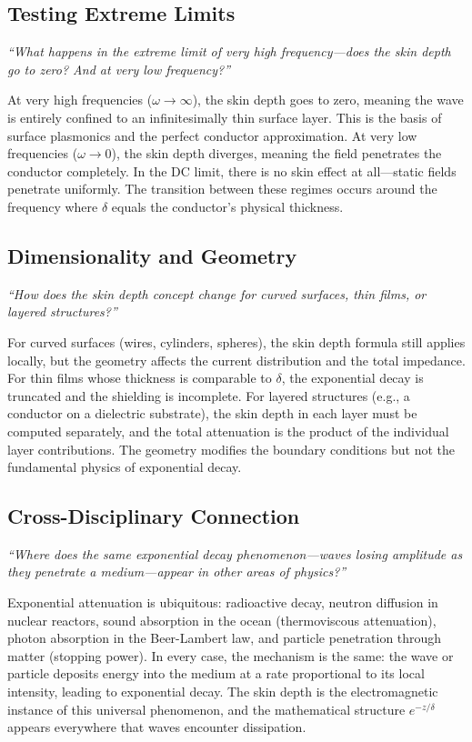 \subsection*{Testing Extreme Limits}
\textit{``What happens in the extreme limit of very high frequency---does the skin depth go to zero? And at very low frequency?''}

At very high frequencies ($\omega \to \infty$), the skin depth goes to zero, meaning the wave is entirely confined to an infinitesimally thin surface layer. This is the basis of surface plasmonics and the perfect conductor approximation. At very low frequencies ($\omega \to 0$), the skin depth diverges, meaning the field penetrates the conductor completely. In the DC limit, there is no skin effect at all---static fields penetrate uniformly. The transition between these regimes occurs around the frequency where $\delta$ equals the conductor's physical thickness.

\subsection*{Dimensionality and Geometry}
\textit{``How does the skin depth concept change for curved surfaces, thin films, or layered structures?''}

For curved surfaces (wires, cylinders, spheres), the skin depth formula still applies locally, but the geometry affects the current distribution and the total impedance. For thin films whose thickness is comparable to $\delta$, the exponential decay is truncated and the shielding is incomplete. For layered structures (e.g., a conductor on a dielectric substrate), the skin depth in each layer must be computed separately, and the total attenuation is the product of the individual layer contributions. The geometry modifies the boundary conditions but not the fundamental physics of exponential decay.

\subsection*{Cross-Disciplinary Connection}
\textit{``Where does the same exponential decay phenomenon---waves losing amplitude as they penetrate a medium---appear in other areas of physics?''}

Exponential attenuation is ubiquitous: radioactive decay, neutron diffusion in nuclear reactors, sound absorption in the ocean (thermoviscous attenuation), photon absorption in the Beer-Lambert law, and particle penetration through matter (stopping power). In every case, the mechanism is the same: the wave or particle deposits energy into the medium at a rate proportional to its local intensity, leading to exponential decay. The skin depth is the electromagnetic instance of this universal phenomenon, and the mathematical structure $e^{-z/\delta}$ appears everywhere that waves encounter dissipation.

